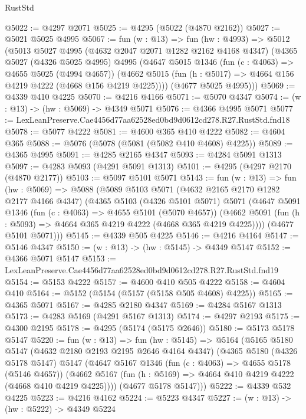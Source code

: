 \begin{lexlean}{RustStd}
\begin{coremodule}
@5022 := @4297 @2071
@5025 := @4295 (@5022 (@4870 @2162))
@5027 := @5021 @5025 @4995
@5067 := fun (w : @13) =>
  fun (hw : @4993) =>
  @5012
    (@5013
      @5027
      @4995
      (@4632 @2047 @2071 @1282 @2162 @4168 @4347)
      (@4365
        @5027
        (@4326 @5025 @4995)
        @4995
        (@4647
          @5015
          @1346
          (fun (c : @4063) => @4655 @5025 (@4994 @4657))
          (@4662 @5015 (fun (h : @5017) => @4664 @156 @4219 @4222 (@4668 @156 @4219 @4225))))
        (@4677 @5025 @4995)))
@5069 := @4339 @410 @4225
@5070 := @4216 @4166
@5071 := @5070 @4347
@5074 := (w : @13) -> (hw : @5069) -> @4349 @5071
@5076 := @4366 @4995 @5071
@5077 := LexLeanPreserve.Cae4456d77aa62528ed0bd9d0612cd278.R27.RustStd.fnd18
@5078 := @5077 @4222
@5081 := @4600 @365 @410 @4222
@5082 := @4604 @365
@5088 := @5076 (@5078 (@5081 (@5082 @410 @4608) @4225))
@5089 := @4365 @4995
@5091 := @4285 @2165 @4347
@5093 := @4284 @5091 @1313
@5097 := @4283 @5093 (@4291 @5091 @1313)
@5101 := @4295 (@4297 @2170 (@4870 @2177))
@5103 := @5097 @5101 @5071
@5143 := fun (w : @13) =>
  fun (hw : @5069) =>
  @5088
    (@5089
      @5103
      @5071
      (@4632 @2165 @2170 @1282 @2177 @4166 @4347)
      (@4365
        @5103
        (@4326 @5101 @5071)
        @5071
        (@4647
          @5091
          @1346
          (fun (c : @4063) => @4655 @5101 (@5070 @4657))
          (@4662 @5091 (fun (h : @5093) => @4664 @365 @4219 @4222 (@4668 @365 @4219 @4225))))
        (@4677 @5101 @5071)))
@5145 := @4339 @505 @4225
@5146 := @4216 @4164
@5147 := @5146 @4347
@5150 := (w : @13) -> (hw : @5145) -> @4349 @5147
@5152 := @4366 @5071 @5147
@5153 := LexLeanPreserve.Cae4456d77aa62528ed0bd9d0612cd278.R27.RustStd.fnd19
@5154 := @5153 @4222
@5157 := @4600 @410 @505 @4222
@5158 := @4604 @410
@5164 := @5152 (@5154 (@5157 (@5158 @505 @4608) @4225))
@5165 := @4365 @5071
@5167 := @4285 @2180 @4347
@5169 := @4284 @5167 @1313
@5173 := @4283 @5169 (@4291 @5167 @1313)
@5174 := @4297 @2193
@5175 := @4300 @2195
@5178 := @4295 (@5174 (@5175 @2646))
@5180 := @5173 @5178 @5147
@5220 := fun (w : @13) =>
  fun (hw : @5145) =>
  @5164
    (@5165
      @5180
      @5147
      (@4632 @2180 @2193 @2195 @2646 @4164 @4347)
      (@4365
        @5180
        (@4326 @5178 @5147)
        @5147
        (@4647
          @5167
          @1346
          (fun (c : @4063) => @4655 @5178 (@5146 @4657))
          (@4662 @5167 (fun (h : @5169) => @4664 @410 @4219 @4222 (@4668 @410 @4219 @4225))))
        (@4677 @5178 @5147)))
@5222 := @4339 @532 @4225
@5223 := @4216 @4162
@5224 := @5223 @4347
@5227 := (w : @13) -> (hw : @5222) -> @4349 @5224

\end{coremodule}
\end{lexlean}
